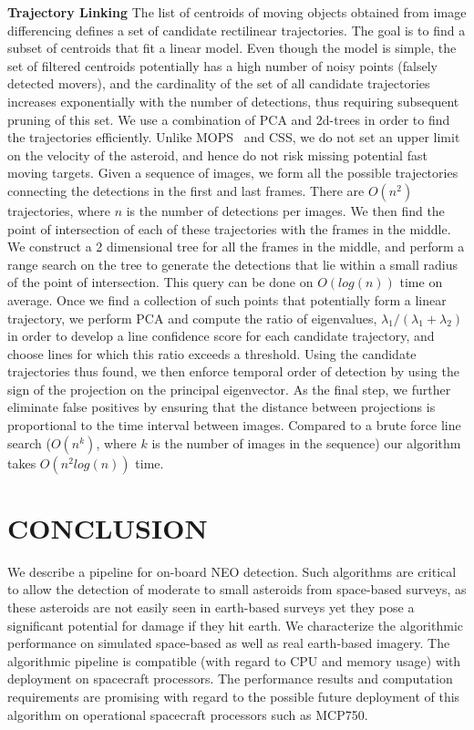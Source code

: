 \documentclass{article}
\begin{document}
{\bf Trajectory Linking}
The list of centroids of moving objects obtained from image differencing defines a set of candidate rectilinear trajectories.  The goal is to find a subset of centroids that fit a linear model. Even though the model is simple, the set of filtered centroids potentially has a high number of noisy points (falsely detected movers), and the cardinality of the set of all candidate trajectories increases exponentially with the number of detections, thus requiring subsequent pruning of this set. We use a combination of PCA and 2d-trees in order to find the trajectories efficiently. Unlike MOPS~\cite{denneau2013pan} and CSS, we do not set an upper limit on the velocity of the asteroid, and hence do not risk missing potential fast moving targets. Given a sequence of images, we form all the possible trajectories connecting the detections in the first and last frames. There are $O(n^2)$ trajectories, where $n$ is the number of detections per images. We then find the point of intersection of each of these trajectories with the frames in the middle. We construct a 2 dimensional tree for all the frames in the middle, and perform a range search on the tree to generate the detections that lie within a small radius of the point of intersection. This query can be done on $O(log(n))$ time on average. Once we find a collection of such points that potentially form a linear trajectory, we perform PCA and compute the ratio of eigenvalues, $\lambda_{1}/(\lambda_{1}+ \lambda_{2})$ in order to develop a line confidence score for each candidate trajectory, and choose lines for which this ratio exceeds a threshold. Using the candidate trajectories thus found, we then enforce temporal order of detection by using the sign of the projection on the principal eigenvector.  As the final step, we further eliminate false positives by ensuring that the distance between projections is proportional to the time interval between images. Compared to a brute force line search ($O(n^k)$, where $k$ is the number of images in the sequence) our algorithm takes $O(n^2log(n))$ time.



\section{CONCLUSION}
We describe a pipeline for on-board NEO detection. Such algorithms are critical to allow the detection of moderate to small asteroids from space-based surveys, as these asteroids are not easily seen in earth-based surveys yet they pose a significant potential for damage if they hit earth. We characterize the algorithmic performance on simulated space-based as well as real earth-based imagery. The algorithmic pipeline is compatible (with regard to CPU and memory usage) with deployment on spacecraft processors. The performance results and computation requirements are promising with regard to the possible future deployment of this algorithm on operational spacecraft processors such as MCP750. 
\end{document}
